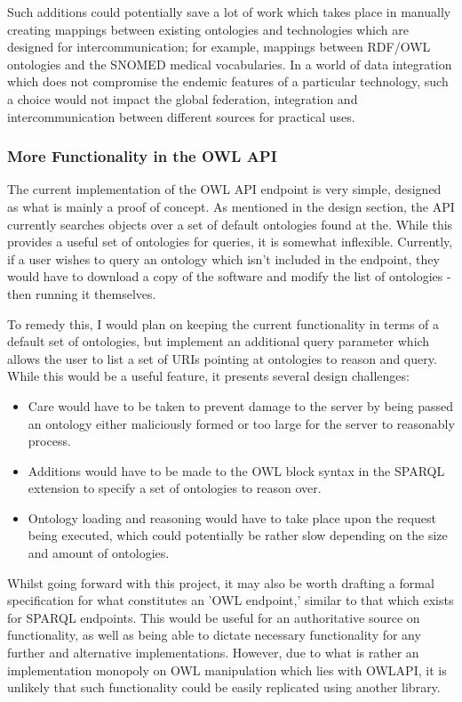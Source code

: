 \documentclass{article}
\begin{document}
Such additions could potentially save a lot of work which takes place in
manually creating mappings between existing ontologies and technologies which
are designed for intercommunication; for example, mappings between RDF/OWL ontologies and the
SNOMED medical vocabularies\cite{snomed1}. In a world of data integration which does not
compromise the endemic features of a particular technology, such a choice would
not impact the global federation, integration and intercommunication between
different sources for practical uses.

\subsubsection{More Functionality in the OWL API}

The current implementation of the OWL API endpoint is very simple, designed as
what is mainly a proof of concept. As mentioned in the design
section, the API currently searches objects over a set of default ontologies
found at the\cite{obofoundry}. While this provides a useful set of
ontologies for queries, it is somewhat inflexible. Currently, if a user wishes
to query an ontology which isn't included in the endpoint, they
would have to download a copy of the software and modify the list of ontologies
- then running it themselves.

To remedy this, I would plan on keeping the current functionality in terms of a
default set of ontologies, but implement an additional query
parameter which allows the user to list a set of URIs pointing at ontologies to
reason and query. While this would be a useful feature, it
presents several design challenges: 

\begin{itemize}
    \item Care would have to be taken to prevent damage to the server by being
    passed an ontology either maliciously formed or too large for the server to
    reasonably process.
    \item Additions would have to be made to the OWL block syntax in the SPARQL
    extension to specify a set of ontologies to reason over.
    \item Ontology loading and reasoning would have to take place upon the
    request being executed, which could potentially be rather slow depending on
    the size and amount of ontologies.
\end{itemize}

Whilst going forward with this project, it may also be worth drafting a formal
specification for what constitutes an 'OWL endpoint,' similar
to that which exists for SPARQL endpoints. This would be useful for an
authoritative source on functionality, as well as being able
to dictate necessary functionality for any further and alternative
implementations. However, due to what is rather an implementation monopoly on
OWL manipulation which lies with OWLAPI, it is unlikely that such functionality
could be easily replicated using another library.
\end{document}
